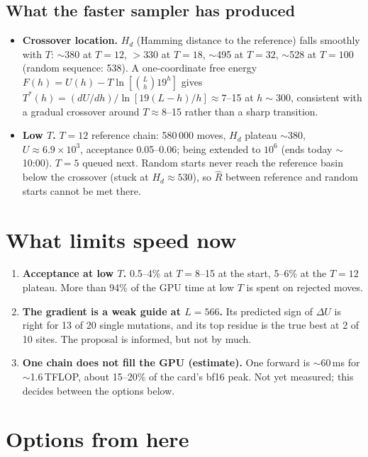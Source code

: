 \documentclass[11pt,a4paper]{article}
\newcommand{\Hd}{H_d}
\begin{document}
\subsection{What the faster sampler has produced}

\begin{itemize}
\item \textbf{Crossover location.} $\Hd$ (Hamming distance to the reference)
  falls smoothly with $T$: $\sim$380 at $T=12$, $>330$ at $T=18$, $\sim$495 at
  $T=32$, $\sim$528 at $T=100$ (random sequence: 538). A one-coordinate free
  energy $F(h)=U(h)-T\ln[\binom{L}{h}19^h]$ gives
  $T^*(h)=(dU/dh)/\ln[19(L-h)/h]\approx7$--15 at $h\sim300$, consistent with a
  gradual crossover around $T\approx8$--15 rather than a sharp transition.
\item \textbf{Low $T$.} $T=12$ reference chain: 580\,000 moves, $\Hd$ plateau
  $\sim$380, $U\approx6.9\times10^3$, acceptance 0.05--0.06; being extended
  to $10^6$ (ends today $\sim$10:00). $T=5$ queued next. Random starts never
  reach the reference basin below the crossover (stuck at $\Hd\approx530$),
  so $\hat R$ between reference and random starts cannot be met there.
\end{itemize}

\section{What limits speed now}

\begin{enumerate}
\item \textbf{Acceptance at low $T$.} 0.5--4\% at $T=8$--15 at the start,
  5--6\% at the $T=12$ plateau. More than 94\% of the GPU time at low $T$ is
  spent on rejected moves.
\item \textbf{The gradient is a weak guide at $L=566$.} Its predicted sign of
  $\Delta U$ is right for 13 of 20 single mutations, and its top residue is
  the true best at 2 of 10 sites. The proposal is informed, but not by much.
\item \textbf{One chain does not fill the GPU (estimate).} One forward is
  $\sim$60\,ms for $\sim$1.6\,TFLOP, about 15--20\% of the card's bf16 peak.
  Not yet measured; this decides between the options below.
\end{enumerate}

\section{Options from here}
\end{document}
